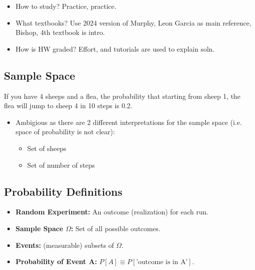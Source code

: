 \begin{faq}
    \begin{itemize}
        \item How to study? Practice, practice.
        \item What textbooks? Use 2024 version of Murphy, Leon Garcia as main reference, Bishop, 4th textbook is intro.
        \item How is HW graded? Effort, and tutorials are used to explain soln. 
    \end{itemize}
\end{faq}

\subsection{Sample Space}
\begin{motivation}
    If you have 4 sheeps and a flea, the probability that starting from sheep 1, the flea will jump to sheep 4 in 10 steps is 0.2.
    \begin{itemize}
        \item Ambigious as there are 2 different interpretations for the sample space (i.e. space of probability is not clear):
        \begin{itemize}
            \item Set of sheeps
            \item Set of number of steps
        \end{itemize}
    \end{itemize}
\end{motivation}

\subsection{Probability Definitions}
\begin{definition}
    \begin{itemize}
        \item \textbf{Random Experiment:} An outcome (realization) for each run. 
        \item \textbf{Sample Space $\Omega$:} Set of all possible outcomes.
        \item \textbf{Events:} (measurable) subsets of $\Omega$.
        \item \textbf{Probability of Event A:} $P[A] \equiv P[\text{'outcome is in A'}]$.
    \end{itemize}
\end{definition}


